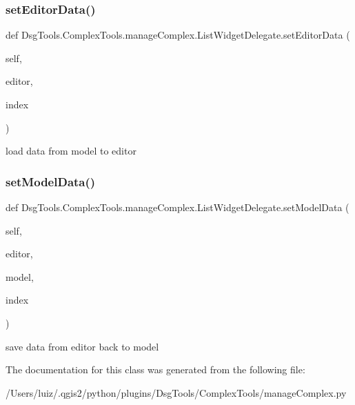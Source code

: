 \subsubsection{\texorpdfstring{set\+Editor\+Data()}{setEditorData()}}
{\footnotesize\ttfamily def Dsg\+Tools.\+Complex\+Tools.\+manage\+Complex.\+List\+Widget\+Delegate.\+set\+Editor\+Data (\begin{DoxyParamCaption}\item[{}]{self,  }\item[{}]{editor,  }\item[{}]{index }\end{DoxyParamCaption})}

\begin{DoxyVerb}load data from model to editor
\end{DoxyVerb}
 \mbox{\label{class_dsg_tools_1_1_complex_tools_1_1manage_complex_1_1_list_widget_delegate_aa63be398b10cf12cc45bb03efd49de66}} 
\subsubsection{\texorpdfstring{set\+Model\+Data()}{setModelData()}}
{\footnotesize\ttfamily def Dsg\+Tools.\+Complex\+Tools.\+manage\+Complex.\+List\+Widget\+Delegate.\+set\+Model\+Data (\begin{DoxyParamCaption}\item[{}]{self,  }\item[{}]{editor,  }\item[{}]{model,  }\item[{}]{index }\end{DoxyParamCaption})}

\begin{DoxyVerb}save data from editor back to model
\end{DoxyVerb}
 

The documentation for this class was generated from the following file\+:\begin{DoxyCompactItemize}
\item 
/\+Users/luiz/.\+qgis2/python/plugins/\+Dsg\+Tools/\+Complex\+Tools/manage\+Complex.\+py\end{DoxyCompactItemize}
